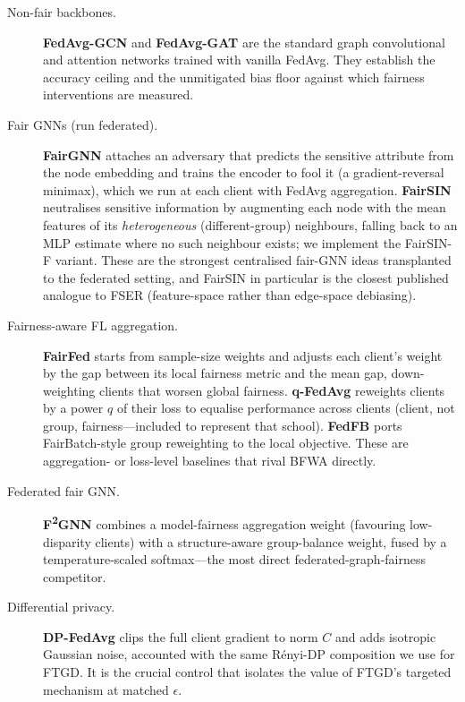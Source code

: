 \begin{description}
\item[Non-fair backbones.] \textbf{FedAvg-GCN} and \textbf{FedAvg-GAT}
\cite{kipf2016semi,velickovic2017graph,mcmahan2017communication} are the
standard graph convolutional and attention networks trained with vanilla FedAvg.
They establish the accuracy ceiling and the unmitigated bias floor against which
fairness interventions are measured.

\item[Fair GNNs (run federated).] \textbf{FairGNN} \cite{dai2021say} attaches an
adversary that predicts the sensitive attribute from the node embedding and
trains the encoder to fool it (a gradient-reversal minimax), which we run at each
client with FedAvg aggregation. \textbf{FairSIN} \cite{yang2024fairsin}
neutralises sensitive information by augmenting each node with the mean features
of its \emph{heterogeneous} (different-group) neighbours, falling back to an MLP
estimate where no such neighbour exists; we implement the FairSIN-F variant.
These are the strongest centralised fair-GNN ideas transplanted to the federated
setting, and FairSIN in particular is the closest published analogue to FSER
(feature-space rather than edge-space debiasing).

\item[Fairness-aware FL aggregation.] \textbf{FairFed} \cite{ezzeldin2023fairfed}
starts from sample-size weights and adjusts each client's weight by the gap
between its local fairness metric and the mean gap, down-weighting clients that
worsen global fairness. \textbf{q-FedAvg} \cite{li2020fair} reweights clients by
a power $q$ of their loss to equalise performance across clients (client, not
group, fairness---included to represent that school). \textbf{FedFB} ports
FairBatch-style group reweighting to the local objective. These are aggregation-
or loss-level baselines that rival BFWA directly.

\item[Federated fair GNN.] \textbf{F\textsuperscript{2}GNN} \cite{f2gnn2023}
combines a model-fairness aggregation weight (favouring low-disparity clients)
with a structure-aware group-balance weight, fused by a temperature-scaled
softmax---the most direct federated-graph-fairness competitor.

\item[Differential privacy.] \textbf{DP-FedAvg} \cite{mcmahan2018learning} clips
the full client gradient to norm $C$ and adds isotropic Gaussian noise,
accounted with the same R\'enyi-DP composition we use for FTGD. It is the crucial
control that isolates the value of FTGD's targeted mechanism at matched
$\epsilon$.


\end{description}
